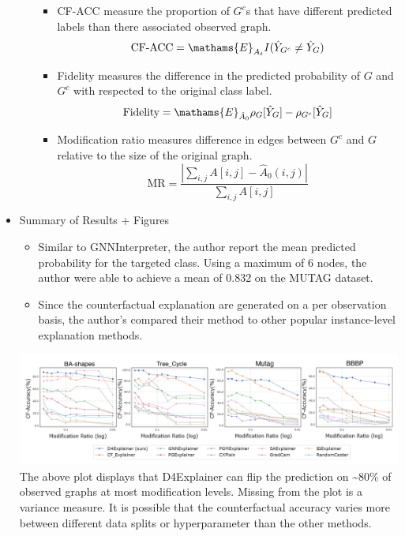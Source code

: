 \documentclass[
  11pt,
  letterpaper,
]{article}
\begin{document}
\begin{itemize}
\begin{itemize}
    \begin{itemize}
    \item
      CF-ACC measure the proportion of \(G^c\)s that have different
      predicted labels than there associated observed graph.\\
      \begin{equation}
         \text{CF-ACC} = \mathams{E}_{A_t} I(\hat Y_{G^c} \neq \hat Y_{G}) 
        \end{equation}
    \item
      Fidelity measures the difference in the predicted probability of
      \(G\) and \(G^c\) with respected to the original class label.\\
      \begin{equation}
        \text{Fidelity} = \mathams{E}_{\hat A_0} \rho_{G}[\hat Y_G] - \rho_{G^c}[\hat Y_G]
        \end{equation}
    \item
      Modification ratio measures difference in edges between \(G^c\)
      and \(G\) relative to the size of the original graph.\\
      \begin{equation}
        \text{MR} = \dfrac{|\sum_{i, j} A[i, j] - \hat A_0(i, j)|}{\sum_{i, j} A[i, j]}
        \end{equation}
    \end{itemize}
  \end{itemize}
\item
  Summary of Results + Figures

  \begin{itemize}
  \item
    Similar to GNNInterpreter, the author report the mean predicted
    probability for the targeted class. Using a maximum of 6 nodes, the
    author were able to achieve a mean of 0.832 on the MUTAG dataset.
  \item
    Since the counterfactual explanation are generated on a per
    observation basis, the author's compared their method to other
    popular instance-level explanation methods.
  \end{itemize}

  \includegraphics{figures/D4-CF-Plot.png} The above plot displays that
  D4Explainer can flip the prediction on \textasciitilde80\% of observed
  graphs at most modification levels. Missing from the plot is a
  variance measure. It is possible that the counterfactual accuracy
  varies more between different data splits or hyperparameter than the
  other methods.


\end{itemize}
\end{document}
